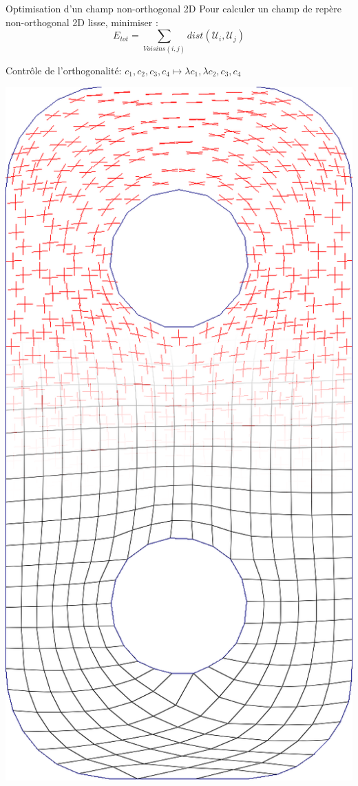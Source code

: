 \begin{frame}{Optimisation d'un champ non-orthogonal 2D}
    \centering
    \small
    Pour calculer un champ de repère non-orthogonal 2D lisse, minimiser :
    $$ E_{tot} = \sum_{Voisins(i, j)} dist(\mathcal{U}_i, \mathcal{U}_j)$$
    
    Contrôle de l'orthogonalité: $c_1, c_2, c_3, c_4 \mapsto \lambda c_1, \lambda c_2, c_3, c_4$ 
     
     \vspace*{0.5\baselineskip}
    \begin{minipage}[b]{0.15\textwidth}
        \centering
        \includegraphics[width=\textwidth]{img_spm_ff/perced_1}

\end{minipage}
\end{frame}
